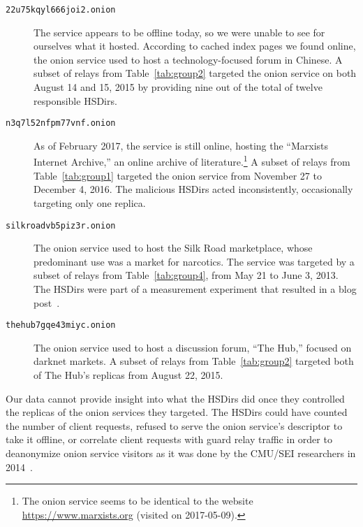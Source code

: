 \begin{description}
	\item[\texttt{22u75kqyl666joi2.onion}] The service appears to be offline
		today, so we were unable to see for ourselves what it hosted.  According
		to cached index pages we found online, the onion service used to host a
		technology-focused forum in Chinese.  A subset of relays from
		Table~\ref{tab:group2} targeted the onion service on both August 14 and
		15, 2015 by providing nine out of the total of twelve responsible
		HSDirs.

	\item[\texttt{n3q7l52nfpm77vnf.onion}] As of February 2017, the service is
		still online, hosting the ``Marxists Internet Archive,'' an online
		archive of literature.\footnote{The onion service seems to be identical
		to the website \url{https://www.marxists.org} (visited on 2017-05-09).}
		A subset of relays from Table~\ref{tab:group1} targeted the onion
		service from November 27 to December 4, 2016.  The malicious HSDirs
		acted inconsistently, occasionally targeting only one replica.

	\item[\texttt{silkroadvb5piz3r.onion}] The onion service used to host the
		Silk Road marketplace, whose predominant use was a market for narcotics.
		The service was targeted by a subset of relays from
		Table~\ref{tab:group4}, from May 21 to June 3, 2013.  The HSDirs were
		part of a measurement experiment that resulted in a blog
		post~\cite{OCearbhaill2013a}.

	\item[\texttt{thehub7gqe43miyc.onion}] The onion service used to host a
		discussion forum, ``The Hub,'' focused on darknet markets.  A subset of
		relays from Table~\ref{tab:group2} targeted both of The Hub's replicas
		from August 22, 2015.
\end{description}

Our data cannot provide insight into what the HSDirs did once they controlled
the replicas of the onion services they targeted.  The HSDirs could have counted
the number of client requests, refused to serve the onion service's descriptor
to take it offline, or correlate client requests with guard relay traffic in
order to deanonymize onion service visitors as it was done by the CMU/SEI
researchers in 2014~\cite{Dingledine2014a}.
